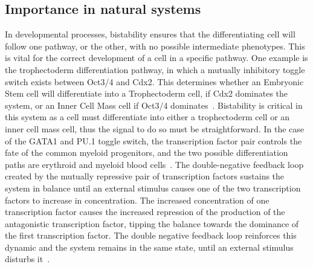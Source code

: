 \subsection{Importance in natural systems}
In developmental processes, bistability ensures that the differentiating cell will follow one pathway, or the other, with no possible intermediate phenotypes. This is vital for the correct development of a cell in a specific pathway. One example is the trophectoderm differentiation pathway, in which a mutually inhibitory toggle switch exists between Oct3/4 and Cdx2. This determines whether an Embryonic Stem cell will differentiate into a Trophectoderm cell, if Cdx2 dominates the system, or an Inner Cell Mass cell if Oct3/4 dominates~\autocite{Niwa:2005fz}. Bistability is critical in this system as a cell must differentiate into either a trophectoderm cell or an inner cell mass cell, thus the signal to do so must be straightforward. In the case of the GATA1 and PU.1 toggle switch, the transcription factor pair controls the fate of the common myeloid progenitors, and the two possible differentiation paths are erythroid and myeloid blood cells~\autocite{Chickarmane:2009by}. The double-negative feedback loop created by the mutually repressive pair of transcription factors sustains the system in balance until an external stimulus causes one of the two transcription factors to increase in concentration. The increased concentration of one transcription factor causes the increased repression of the production of the antagonistic transcription factor, tipping the balance towards the dominance of the first transcription factor. The double negative feedback loop reinforces this dynamic and the system remains in the same state, until an external stimulus disturbs it~\autocite{FerrellJr:2002fh}.

